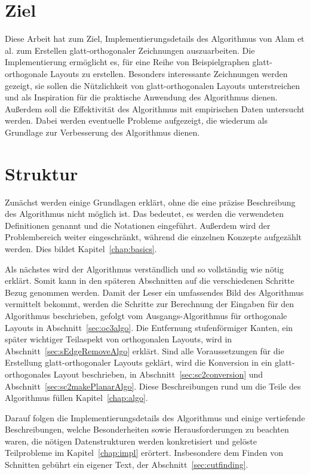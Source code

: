 \documentclass[a4paper]{scrreprt}
\theoremstyle{definition}
\newcommand{\go}{glatt-or\-tho\-go\-nal}
\begin{document}
\section{Ziel}

Diese Arbeit hat zum Ziel, Implementierungsdetails des Algorithmus von Alam et al. zum Erstellen glatt-orthogonaler Zeichnungen auszuarbeiten. Die Implementierung ermöglicht es, für eine Reihe von Beispielgraphen \go e Layouts zu erstellen. Besonders interessante Zeichnungen werden gezeigt, sie sollen die Nützlichkeit von glatt-orthogonalen Layouts unterstreichen und als Inspiration für die praktische Anwendung des Algorithmus dienen. Außerdem soll die Effektivität des Algorithmus mit empirischen Daten untersucht werden. Dabei werden eventuelle Probleme aufgezeigt, die wiederum als Grundlage zur Verbesserung des Algorithmus dienen. 


\section{Struktur}

Zunächst werden einige Grundlagen erklärt, ohne die eine präzise Beschreibung des Algorithmus nicht möglich ist.  Das bedeutet, es werden die verwendeten Definitionen genannt und die Notationen eingeführt. Außerdem wird der Problembereich weiter eingeschränkt, während die einzelnen Konzepte aufgezählt werden. Dies bildet Kapitel~\ref{chap:basics}.

Als nächstes wird der Algorithmus verständlich und so vollständig wie nötig erklärt. Somit kann in den späteren Abschnitten auf die verschiedenen Schritte Bezug genommen werden. Damit der Leser ein umfassendes Bild des Algorithmus vermittelt bekommt, werden die Schritte zur Berechnung der Eingaben für den Algorithmus beschrieben, gefolgt vom Ausgangs-Algorithmus für orthogonale Layouts in Abschnitt~\ref{sec:oc3algo}. Die Entfernung stufenförmiger Kanten, ein später wichtiger Teilaspekt von orthogonalen Layouts, wird in Abschnitt~\ref{sec:sEdgeRemoveAlgo} erklärt. Sind alle Voraussetzungen für die Erstellung \go er Layouts geklärt, wird die Konversion in ein \go es Layout beschrieben, in Abschnitt~\ref{sec:sc2conversion} und Abschnitt~\ref{sec:sc2makePlanarAlgo}. Diese Beschreibungen rund um die Teile des Algorithmus füllen Kapitel~\ref{chap:algo}.

Darauf folgen die Implementierungsdetails des Algorithmus und einige vertiefende Beschreibungen, welche Besonderheiten sowie Herausforderungen zu beachten waren, die nötigen Datenstrukturen werden konkretisiert und gelöste Teilprobleme im Kapitel~\ref{chap:impl} erörtert. Insbesondere dem Finden von Schnitten gebührt ein eigener Text, der Abschnitt~\ref{sec:cutfinding}.
\end{document}
